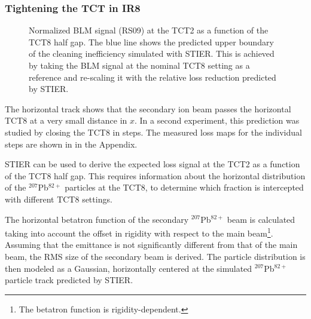 \subsubsection{Tightening the TCT in IR8}

\begin{figure}[b]
  \centering
  \caption{Normalized BLM signal (RS09) at the TCT2 as a function of the TCT8 half gap. The blue line shows the predicted upper boundary of the cleaning inefficiency simulated with STIER. This is achieved by taking the BLM signal at the nominal TCT8 setting as a reference and re-scaling it with the relative loss reduction predicted by STIER.}  
  \label{pic:16062101}
  \end{figure}

The horizontal track shows that the secondary ion beam passes the horizontal TCT8 at a very small distance in $x$. In a second experiment, this prediction was studied by closing the TCT8 in steps. The measured loss maps for the individual steps are shown in  in the Appendix. 

STIER can be used to derive the expected loss signal at the TCT2 as a function of the TCT8 half gap. This requires information about the horizontal distribution of the $^{207}$Pb$^{82+}$ particles at the TCT8, to determine which fraction is intercepted with different TCT8 settings. 

The horizontal betatron function of the secondary $^{207}$Pb$^{82+}$ beam is calculated taking into account the offset in rigidity with respect to the main beam\footnote{The betatron function is rigidity-dependent.}. Assuming that the emittance is not significantly different from that of the main beam, the RMS size of the secondary beam is derived. The particle distribution is then modeled as a Gaussian, horizontally centered at the simulated $^{207}$Pb$^{82+}$ particle track predicted by STIER. 


